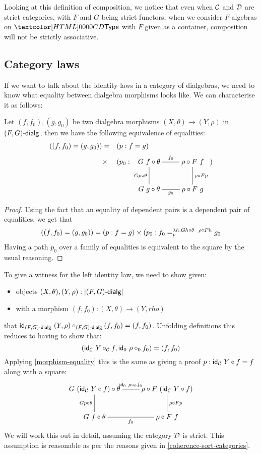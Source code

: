 Looking at this definition of composition, we notice that even when
$\Cc$ and $\Dd$ are strict categories, with $F$ and $G$ being strict
functors, \eg when we consider $F$-algebras on $\Type$ with $F$ given
as a container, composition will not be strictly associative.

\subsection{Category laws}

If we want to talk about the identity laws in a category of
dialgebras, we need to know what equality between dialgebra morphisms
looks like. We can characterise it as follows:

\begin{proposition}
  \label{morphism-equality}
  Let $(f,f_0),(g,g_0)$ be two dialgebra morphisms
  $(X,\theta) \to (Y,\rho)$ in $\dialgcat{F}{G}$, then we have the
  following equivalence of equalities:
  \begin{align*}
    ((f,f_0) = (g,g_0)) &= &&(p : f = g)\\
    &\times &&(p_0 : 
              \xymatrix{
              G\ f \circ \theta
              \ar@{-}[r]^{f_0}
              \ar@{-}[d]_{G p \circ \theta}
              &\rho \circ F\ f
              \ar@{-}[d]^{\rho \circ F p}
              \\
              G\ g \circ \theta
              \ar@{-}[r]_{g_0}
              &\rho \circ F\ g
              })
  \end{align*}
\end{proposition}

\begin{proof}
  Using the fact that an equality of dependent pairs is a dependent pair of equalities, we get that
  $$
  ((f,f_0) = (g,g_0)) = (p : f = g) \times (p_0 : \pathover{\lambda h . G h \circ \theta = \rho \circ F h}{p}{f_0}{g_0}
  $$
  Having a path $p_0$ over a family of equalities is equivalent to the
  square by the usual reasoning.
\end{proof}

To give a witness for the left identity law, we need to show given:
\begin{itemize}
\item objects $(X,\theta), (Y,\rho) : |\dialgcat{F}{G}|$
\item with a morphism $(f,f_0) : (X,\theta) \to (Y,rho)$
\end{itemize}
that $\id_{\dialgcat{F}{G}}\ (Y,\rho) \circ_{\dialgcat{F}{G}} (f,f_0) = (f,f_0)$. Unfolding definitions this reduces to having to show that:
$$
(\id_{\Cc}\ Y \circ_{\Cc} f , \id_0\ \rho \circ_0 f_0) = (f,f_0)
$$
Applying \cref{morphism-equality} this is the same as giving a proof $p : \id_{\Cc}\ Y \circ f = f$ along with a square:
$$
\xymatrix{
  G\ (\id_{\Cc}\ Y \circ f) \circ \theta
  \ar@{-}[r]^{\id_0\ \rho \circ_0 f_0}
  \ar@{-}[d]_{G p \circ \theta}
  &\rho \circ F\ (\id_{\Cc}\ Y \circ f)
  \ar@{-}[d]^{\rho \circ F p}
  \\
  G\ f \circ \theta
  \ar@{-}[r]_{f_0}
  &\rho \circ F\ f
}
$$
We will work this out in detail, assuming the category $\Dd$ is
strict. This assumption is reasonable as per the reasons given in
\cref{coherence-sort-categories}.

